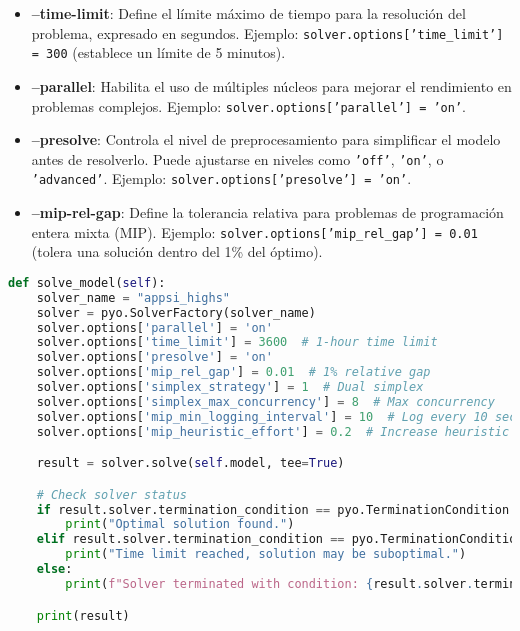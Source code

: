 \documentclass[12pt]{article}
\begin{document}
\begin{itemize}
    \item \textbf{--time-limit}: Define el límite máximo de tiempo para la resolución del problema, expresado en segundos. Ejemplo: \texttt{solver.options['time_limit'] = 300} (establece un límite de 5 minutos).
    \item \textbf{--parallel}: Habilita el uso de múltiples núcleos para mejorar el rendimiento en problemas complejos. Ejemplo: \texttt{solver.options['parallel'] = 'on'}.
    \item \textbf{--presolve}: Controla el nivel de preprocesamiento para simplificar el modelo antes de resolverlo. Puede ajustarse en niveles como \texttt{'off'}, \texttt{'on'}, o \texttt{'advanced'}. Ejemplo: \texttt{solver.options['presolve'] = 'on'}.
    \item \textbf{--mip-rel-gap}: Define la tolerancia relativa para problemas de programación entera mixta (MIP). Ejemplo: \texttt{solver.options['mip_rel_gap'] = 0.01} (tolera una solución dentro del 1\% del óptimo).
\end{itemize}

\begin{lstlisting}[language=Python, caption={Ejemplo de configuración para HiGHS en Pyomo}, label={lst:pyomo-highs}, breaklines=true]
def solve_model(self):
    solver_name = "appsi_highs"
    solver = pyo.SolverFactory(solver_name)
    solver.options['parallel'] = 'on'
    solver.options['time_limit'] = 3600  # 1-hour time limit
    solver.options['presolve'] = 'on'
    solver.options['mip_rel_gap'] = 0.01  # 1% relative gap
    solver.options['simplex_strategy'] = 1  # Dual simplex
    solver.options['simplex_max_concurrency'] = 8  # Max concurrency
    solver.options['mip_min_logging_interval'] = 10  # Log every 10 seconds
    solver.options['mip_heuristic_effort'] = 0.2  # Increase heuristic effort

    result = solver.solve(self.model, tee=True)

    # Check solver status
    if result.solver.termination_condition == pyo.TerminationCondition.optimal:
        print("Optimal solution found.")
    elif result.solver.termination_condition == pyo.TerminationCondition.maxTimeLimit:
        print("Time limit reached, solution may be suboptimal.")
    else:
        print(f"Solver terminated with condition: {result.solver.termination_condition}")

    print(result)
\end{lstlisting}
\end{document}

